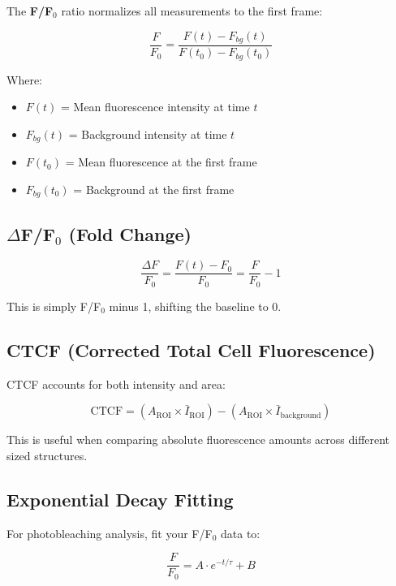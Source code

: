 \documentclass[11pt,a4paper]{article}
\begin{document}
The \textbf{F/F$_0$} ratio normalizes all measurements to the first frame:

\begin{equation}
\frac{F}{F_0} = \frac{F(t) - F_{bg}(t)}{F(t_0) - F_{bg}(t_0)}
\end{equation}

Where:
\begin{itemize}
    \item $F(t)$ = Mean fluorescence intensity at time $t$
    \item $F_{bg}(t)$ = Background intensity at time $t$
    \item $F(t_0)$ = Mean fluorescence at the first frame
    \item $F_{bg}(t_0)$ = Background at the first frame
\end{itemize}

\subsection{$\Delta$F/F$_0$ (Fold Change)}

\begin{equation}
\frac{\Delta F}{F_0} = \frac{F(t) - F_0}{F_0} = \frac{F}{F_0} - 1
\end{equation}

This is simply F/F$_0$ minus 1, shifting the baseline to 0.

\subsection{CTCF (Corrected Total Cell Fluorescence)}

CTCF accounts for both intensity and area:

\begin{equation}
\text{CTCF} = (A_{\text{ROI}} \times \bar{I}_{\text{ROI}}) - (A_{\text{ROI}} \times \bar{I}_{\text{background}})
\end{equation}

This is useful when comparing absolute fluorescence amounts across different sized structures.

\subsection{Exponential Decay Fitting}

For photobleaching analysis, fit your F/F$_0$ data to:

\begin{equation}
\frac{F}{F_0} = A \cdot e^{-t/\tau} + B
\end{equation}
\end{document}
